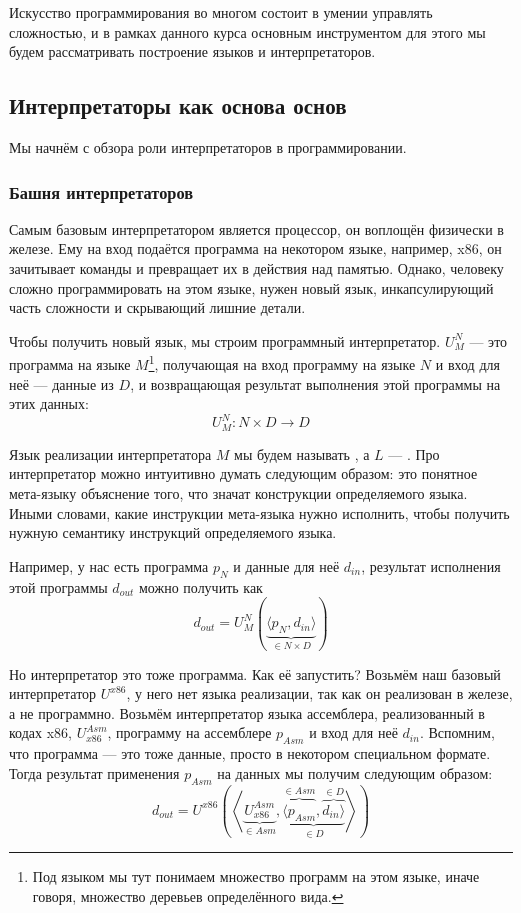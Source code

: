
Искусство программирования во многом состоит в умении управлять сложностью, и в рамках данного курса основным инструментом для этого мы будем рассматривать построение языков и интерпретаторов.

\subsection{Интерпретаторы как основа основ}

Мы начнём с обзора роли интерпретаторов в программировании.

\subsubsection{Башня интерпретаторов} \label{subsec:interpreters-tower}

Самым базовым интерпретатором является процессор, он воплощён физически в железе.
Ему на вход подаётся программа на некотором языке, например, x86, он зачитывает команды и превращает их в действия над памятью.
Однако, человеку сложно программировать на этом языке, нужен новый язык, инкапсулирующий часть сложности и скрывающий лишние детали.

Чтобы получить новый язык, мы строим программный интерпретатор.
 $U_M^N$ --- это программа на языке $M$\footnote{Под языком мы тут понимаем множество программ на этом языке, иначе говоря, множество деревьев определённого вида.}, получающая на вход программу на языке $N$ и вход для неё --- данные из $D$, и возвращающая результат выполнения этой программы на этих данных: \[U_M^N : N\times D\to D\]

Язык реализации интерпретатора $M$ мы будем называть , а $L$ --- .
Про интерпретатор можно интуитивно думать следующим образом: это понятное мета-языку объяснение того, что значат конструкции определяемого языка.
Иными словами, какие инструкции мета-языка нужно исполнить, чтобы получить нужную семантику инструкций определяемого языка.

Например, у нас есть программа $p_N$ и данные для неё $d_{in}$, результат исполнения этой программы $d_{out}$ можно получить как \[d_{out} = U_M^N\left( \underbrace{\langle p_N, d_{in} \rangle}_{\in N\times D} \right)\]

Но интерпретатор это тоже программа.
Как её запустить?
Возьмём наш базовый интерпретатор $U^{x86}$, у него нет языка реализации, так как он реализован в железе, а не программно.
Возьмём интерпретатор языка ассемблера, реализованный в кодах x86, $U_{x86}^{Asm}$, программу на ассемблере $p_{Asm}$ и вход для неё $d_{in}$.
Вспомним, что программа --- это тоже данные, просто в некотором специальном формате.
Тогда результат применения $p_{Asm}$ на данных мы получим следующим образом:
\[
    d_{out} = U^{x86}\left(\left<\underbrace{U_{x86}^{Asm}}_{\in Asm}, \underbrace{\overbrace{\langle p_{Asm}}^{\in Asm}, \overbrace{d_{in} \rangle}^{\in D}}_{\in D} \right>\right)
\]

